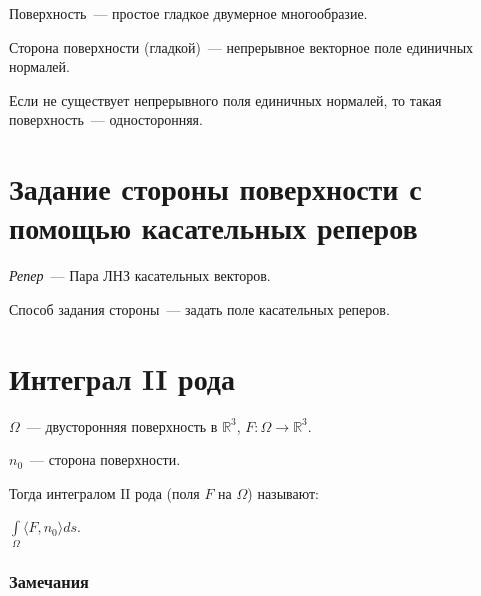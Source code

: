\documentclass{article}
\begin{document}
        Поверхность~--- простое гладкое двумерное многообразие.
    
        Сторона поверхности (гладкой)~--- непрерывное векторное поле единичных нормалей.
        
        Если не существует непрерывного поля единичных нормалей, то такая поверхность~--- односторонняя.
        
    \newpage
        
    \section{Задание стороны поверхности с помощью касательных реперов}
    
        \textit{Репер}~--- Пара ЛНЗ касательных векторов.
        
        Способ задания стороны~--- задать поле касательных реперов.
        
    \newpage
    
    \section{Интеграл II рода}
    
        $\Omega$~--- двусторонняя поверхность в $\mathbb{R}^3$, $F : \Omega \rightarrow \mathbb{R}^3$.
        
        $n_0$~--- сторона поверхности.
        
        Тогда интегралом $\mathrm{II}$ рода (поля $F$ на $\Omega$) называют:
        
        $\int\limits_{\Omega} \langle F, n_0 \rangle ds$.
        
        \subsubsection{Замечания}
        
\end{document}

